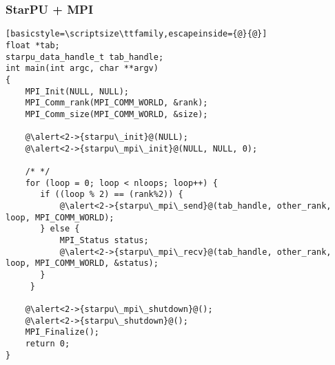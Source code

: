 \begin{frame}[fragile]
  \frametitle{StarPU + MPI}
  \vspace{-4mm}
  \begin{block}{}
\begin{lstlisting}[basicstyle=\scriptsize\ttfamily,escapeinside={@}{@}]
float *tab;
starpu_data_handle_t tab_handle;
int main(int argc, char **argv)
{
    MPI_Init(NULL, NULL);
    MPI_Comm_rank(MPI_COMM_WORLD, &rank);
    MPI_Comm_size(MPI_COMM_WORLD, &size);

    @\alert<2->{starpu\_init}@(NULL);
    @\alert<2->{starpu\_mpi\_init}@(NULL, NULL, 0);

    /* */
    for (loop = 0; loop < nloops; loop++) {
       if ((loop % 2) == (rank%2)) {
           @\alert<2->{starpu\_mpi\_send}@(tab_handle, other_rank, loop, MPI_COMM_WORLD);
       } else {
           MPI_Status status;
           @\alert<2->{starpu\_mpi\_recv}@(tab_handle, other_rank, loop, MPI_COMM_WORLD, &status);
       }
     }

    @\alert<2->{starpu\_mpi\_shutdown}@();
    @\alert<2->{starpu\_shutdown}@();
    MPI_Finalize();
    return 0;
}
\end{lstlisting}
  \end{block}
\end{frame}
